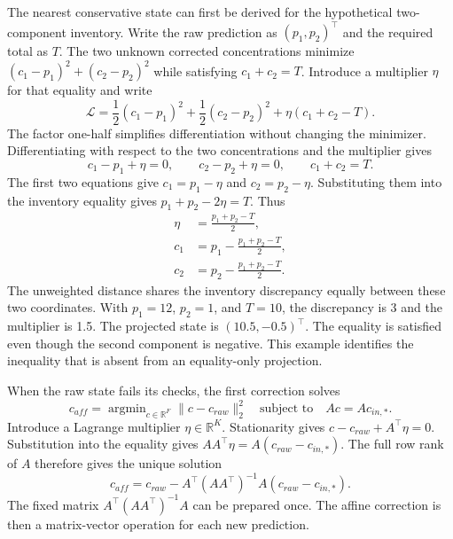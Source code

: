 The nearest conservative state can first be derived for the hypothetical two-component inventory. Write the raw prediction as \((p_1,p_2)^\top\) and the required total as \(T\). The two unknown corrected concentrations minimize \((c_1-p_1)^2+(c_2-p_2)^2\) while satisfying \(c_1+c_2=T\). Introduce a multiplier \(\eta\) for that equality and write
\begin{equation}
\label{eq:icsor_scalar_projection_lagrangian}
\mathcal{L}=\frac{1}{2}(c_1-p_1)^2+
\frac{1}{2}(c_2-p_2)^2+\eta(c_1+c_2-T).
\end{equation}
The factor one-half simplifies differentiation without changing the minimizer. Differentiating with respect to the two concentrations and the multiplier gives
\begin{equation}
\label{eq:icsor_scalar_projection_conditions}
c_1-p_1+\eta=0,
\qquad c_2-p_2+\eta=0,
\qquad c_1+c_2=T.
\end{equation}
The first two equations give \(c_1=p_1-\eta\) and \(c_2=p_2-\eta\). Substituting them into the inventory equality gives \(p_1+p_2-2\eta=T\). Thus
\begin{equation}
\label{eq:icsor_scalar_projection_solution}
\begin{aligned}
\eta&=\frac{p_1+p_2-T}{2},\\
c_1&=p_1-\frac{p_1+p_2-T}{2},\\
c_2&=p_2-\frac{p_1+p_2-T}{2}.
\end{aligned}
\end{equation}
The unweighted distance shares the inventory discrepancy equally between these two coordinates. With \(p_1=12\), \(p_2=1\), and \(T=10\), the discrepancy is 3 and the multiplier is 1.5. The projected state is \((10.5,-0.5)^\top\). The equality is satisfied even though the second component is negative. This example identifies the inequality that is absent from an equality-only projection.

When the raw state fails its checks, the first correction solves
\begin{equation}
\label{eq:icsor_affine_problem}
c_{aff}=\mathop{\arg\min}_{c\in\mathbb{R}^{F}}\|c-c_{raw}\|_2^2
\quad\text{subject to}\quad Ac=Ac_{in,*}.
\end{equation}
Introduce a Lagrange multiplier \(\eta\in\mathbb{R}^{K}\). Stationarity gives \(c-c_{raw}+A^\top\eta=0\). Substitution into the equality gives \(AA^\top\eta=A(c_{raw}-c_{in,*})\). The full row rank of \(A\) therefore gives the unique solution
\begin{equation}
\label{eq:icsor_affine_solution}
c_{aff}=c_{raw}-A^\top(AA^\top)^{-1}A(c_{raw}-c_{in,*}).
\end{equation}
The fixed matrix \(A^\top(AA^\top)^{-1}A\) can be prepared once. The affine correction is then a matrix-vector operation for each new prediction.

